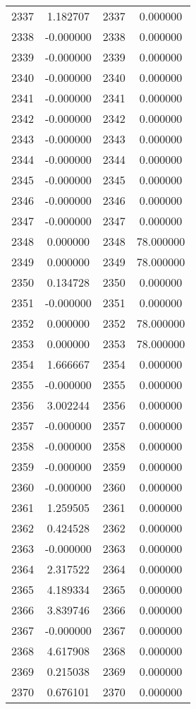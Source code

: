 \documentclass[12pt]{article}
\begin{document}
\begin{longtable}{@{}cccc@{}}
2337 & 1.182707 & 2337 & 0.000000 \\
2338 & -0.000000 & 2338 & 0.000000 \\
2339 & -0.000000 & 2339 & 0.000000 \\
2340 & -0.000000 & 2340 & 0.000000 \\
2341 & -0.000000 & 2341 & 0.000000 \\
2342 & -0.000000 & 2342 & 0.000000 \\
2343 & -0.000000 & 2343 & 0.000000 \\
2344 & -0.000000 & 2344 & 0.000000 \\
2345 & -0.000000 & 2345 & 0.000000 \\
2346 & -0.000000 & 2346 & 0.000000 \\
2347 & -0.000000 & 2347 & 0.000000 \\
2348 & 0.000000 & 2348 & 78.000000 \\
2349 & 0.000000 & 2349 & 78.000000 \\
2350 & 0.134728 & 2350 & 0.000000 \\
2351 & -0.000000 & 2351 & 0.000000 \\
2352 & 0.000000 & 2352 & 78.000000 \\
2353 & 0.000000 & 2353 & 78.000000 \\
2354 & 1.666667 & 2354 & 0.000000 \\
2355 & -0.000000 & 2355 & 0.000000 \\
2356 & 3.002244 & 2356 & 0.000000 \\
2357 & -0.000000 & 2357 & 0.000000 \\
2358 & -0.000000 & 2358 & 0.000000 \\
2359 & -0.000000 & 2359 & 0.000000 \\
2360 & -0.000000 & 2360 & 0.000000 \\
2361 & 1.259505 & 2361 & 0.000000 \\
2362 & 0.424528 & 2362 & 0.000000 \\
2363 & -0.000000 & 2363 & 0.000000 \\
2364 & 2.317522 & 2364 & 0.000000 \\
2365 & 4.189334 & 2365 & 0.000000 \\
2366 & 3.839746 & 2366 & 0.000000 \\
2367 & -0.000000 & 2367 & 0.000000 \\
2368 & 4.617908 & 2368 & 0.000000 \\
2369 & 0.215038 & 2369 & 0.000000 \\
2370 & 0.676101 & 2370 & 0.000000 \\

\end{longtable}
\end{document}

